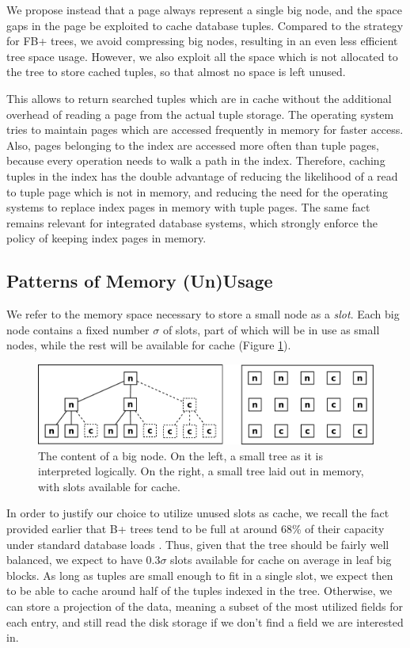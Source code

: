 \documentclass{article}
\begin{document}
We propose instead that a page always represent a single big node, and the space gaps in the page
be exploited to cache database tuples.
Compared to the strategy for FB+ trees, we avoid compressing big nodes, resulting in an
even less efficient tree space usage.
However, we also exploit all the space which is not allocated to the tree to store cached tuples,
so that almost no space is left unused.

This allows to return searched tuples which are in cache without the additional overhead of reading a page from
the actual tuple storage.
The operating system tries to maintain pages which are accessed frequently in memory for faster
access.
Also, pages belonging to the index are accessed more often than tuple pages, because every operation
needs to walk a path in the index.
Therefore, caching tuples in the index has the double advantage of reducing the likelihood
of a read to tuple page which is not in memory, and reducing the need for the operating systems
to replace index pages in memory with tuple pages.
The same fact remains relevant for integrated database systems, which strongly enforce the policy of keeping
index pages in memory.


\subsection{Patterns of Memory (Un)Usage}

We refer to the memory space necessary to store a small node as a \textit{slot}.
Each big node contains a fixed number $\sigma$ of slots, part of which will be in use
as small nodes, while the rest will be available for cache (Figure \ref{fig:inner_block}).
\begin{figure}[h]
\begin{center}
\includegraphics[width=350pt]{inner_block}
\end{center}
\caption{
The content of a big node.
On the left, a small tree as it is interpreted logically.
On the right, a small tree laid out in memory, with slots available for cache.
}
\label{fig:inner_block}
\end{figure}

In order to justify our choice to utilize unused slots as cache,
we recall the fact provided earlier that
B+ trees tend to be full at around 68\% of their capacity under standard database loads \citep{Wu:2011}.
Thus, given that the tree should be fairly well balanced,
we expect to have $0.3 \sigma$ slots available for cache on average in leaf big blocks.
As long as tuples are small enough to fit in a single slot,
we expect then to be able to cache around half of the tuples indexed in the tree.
Otherwise, we can store a projection of the data, meaning a subset of the most utilized fields for each entry,
and still read the disk storage if we don't find a field we are interested in.
\end{document}
